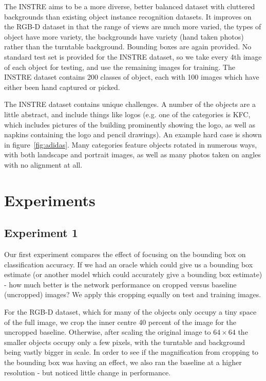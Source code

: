 \documentclass[conference]{IEEEtran}
\begin{document}
The INSTRE \cite{Wang2015} aims to be a more diverse, better balanced dataset with cluttered backgrounds than existing object instance recognition datasets. It improves on the RGB-D dataset in that the range of views are much more varied, the types of object have more variety, the backgrounds have variety (hand taken photos) rather than the turntable background. Bounding boxes are again provided. No standard test set is provided for the INSTRE dataset, so we take every 4th image of each object for testing, and use the remaining images for training. The INSTRE dataset contains 200 classes of object, each with 100 images which have either been hand captured or picked. 

The INSTRE dataset contains unique challenges. A number of the objects are a little abstract, and include things like logos (e.g. one of the categories is KFC, which includes pictures of the building prominently showing the logo, as well as napkins containing the logo and pencil drawings). An example hard case is shown in figure~\ref{fig:adidas}. Many categories feature objects rotated in numerous ways, with both landscape and portrait images, as well as many photos taken on angles with no alignment at all.

\section {Experiments}


\subsection {Experiment 1}

Our first experiment compares the effect of focusing on the bounding box on classification accuracy. If we had an oracle which could give us a bounding box estimate (or another model which could accurately give a bounding box estimate) - how much better is the network performance on cropped versus baseline (uncropped) images? We apply this cropping equally on test and training images.

For the RGB-D dataset, which for many of the objects only occupy a tiny space of the full image, we crop the inner centre 40 percent of the image for the uncropped baseline. Otherwise, after scaling the original image to $ 64 \times 64 $ the smaller objects occupy only a few pixels, with the turntable and background being vastly bigger in scale. In order to see if the magnification from cropping to the bounding box was having an effect, we also ran the baseline at a higher resolution - but noticed little change in performance.
\end{document}
